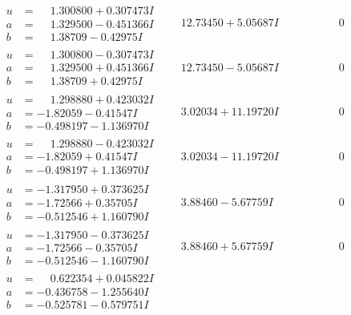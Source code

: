 \documentclass[1p]{elsarticle_modified}
\theoremstyle{definition}
\begin{document}
$$\begin{array}{c|c|c}
\begin{aligned}
u &= \phantom{-}1.300800 + 0.307473 I \\
a &= \phantom{-}1.329500 - 0.451366 I \\
b &= \phantom{-}1.38709 - 0.42975 I\end{aligned}
 & \phantom{-}12.73450 + 5.05687 I & \phantom{-0.000000 } 0 \\ \hline\begin{aligned}
u &= \phantom{-}1.300800 - 0.307473 I \\
a &= \phantom{-}1.329500 + 0.451366 I \\
b &= \phantom{-}1.38709 + 0.42975 I\end{aligned}
 & \phantom{-}12.73450 - 5.05687 I & \phantom{-0.000000 } 0 \\ \hline\begin{aligned}
u &= \phantom{-}1.298880 + 0.423032 I \\
a &= -1.82059 - 0.41547 I \\
b &= -0.498197 - 1.136970 I\end{aligned}
 & \phantom{-}3.02034 + 11.19720 I & \phantom{-0.000000 } 0 \\ \hline\begin{aligned}
u &= \phantom{-}1.298880 - 0.423032 I \\
a &= -1.82059 + 0.41547 I \\
b &= -0.498197 + 1.136970 I\end{aligned}
 & \phantom{-}3.02034 - 11.19720 I & \phantom{-0.000000 } 0 \\ \hline\begin{aligned}
u &= -1.317950 + 0.373625 I \\
a &= -1.72566 + 0.35705 I \\
b &= -0.512546 + 1.160790 I\end{aligned}
 & \phantom{-}3.88460 - 5.67759 I & \phantom{-0.000000 } 0 \\ \hline\begin{aligned}
u &= -1.317950 - 0.373625 I \\
a &= -1.72566 - 0.35705 I \\
b &= -0.512546 - 1.160790 I\end{aligned}
 & \phantom{-}3.88460 + 5.67759 I & \phantom{-0.000000 } 0 \\ \hline\begin{aligned}
u &= \phantom{-}0.622354 + 0.045822 I \\
a &= -0.436758 - 1.255640 I \\
b &= -0.525781 - 0.579751 I\end{aligned}

\end{array}$$
\end{document}
